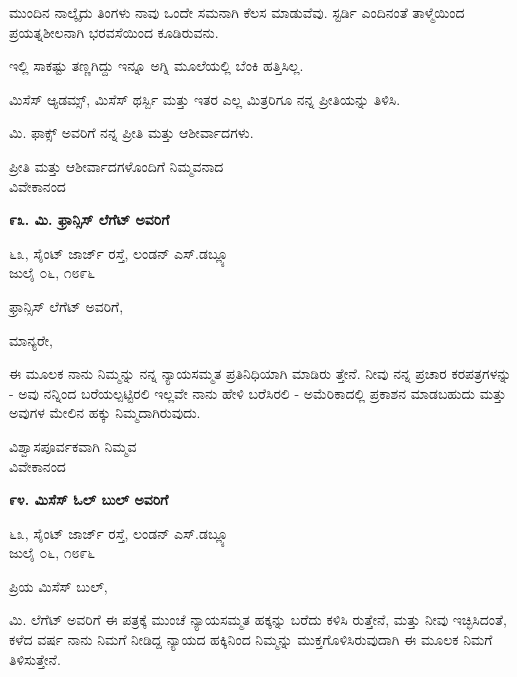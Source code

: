 ಮುಂದಿನ ನಾಲ್ಕೈದು ತಿಂಗಳು ನಾವು ಒಂದೇ ಸಮನಾಗಿ ಕೆಲಸ ಮಾಡುವೆವು. ಸ್ಟರ್ಡಿ ಎಂದಿನಂತೆ ತಾಳ್ಮೆಯಿಂದ ಪ್ರಯತ್ನಶೀಲನಾಗಿ ಭರವಸೆಯಿಂದ ಕೂಡಿರುವನು.

ಇಲ್ಲಿ ಸಾಕಷ್ಟು ತಣ್ಣಗಿದ್ದು ಇನ್ನೂ ಅಗ್ನಿ ಮೂಲೆಯಲ್ಲಿ ಬೆಂಕಿ ಹತ್ತಿಸಿಲ್ಲ.

ಮಿಸೆಸ್ ಆ್ಯಡಮ್ಸ್, ಮಿಸೆಸ್ ಥರ್ಸ್ಬಿ ಮತ್ತು ಇತರ ಎಲ್ಲ ಮಿತ್ರರಿಗೂ ನನ್ನ ಪ್ರೀತಿಯನ್ನು ತಿಳಿಸಿ.

ಮಿ. ಫಾಕ್ಸ್ ಅವರಿಗೆ ನನ್ನ ಪ್ರೀತಿ ಮತ್ತು ಆಶೀರ್ವಾದಗಳು.

\begin{flushright}
ಪ್ರೀತಿ ಮತ್ತು ಆಶೀರ್ವಾದಗಳೊಂದಿಗೆ ನಿಮ್ಮವನಾದ\\ವಿವೇಕಾನಂದ
\end{flushright}

\begin{center}
\textbf{೯೩. ಮಿ. ಫ್ರಾನ್ಸಿಸ್ ಲೆಗೆಟ್ ಅವರಿಗೆ}
\end{center}

\begin{flushright}
೬೩, ಸೈಂಟ್ ಜಾರ್ಜ್ ರಸ್ತೆ, ಲಂಡನ್ ಎಸ್.ಡಬ್ಲ್ಯೂ\\ಜುಲೈ ೦೬, ೧೮೯೬
\end{flushright}

ಫ್ರಾನ್ಸಿಸ್ ಲೆಗೆಟ್ ಅವರಿಗೆ,

ಮಾನ್ಯರೇ,

ಈ ಮೂಲಕ ನಾನು ನಿಮ್ಮನ್ನು ನನ್ನ ನ್ಯಾಯಸಮ್ಮತ ಪ್ರತಿನಿಧಿಯಾಗಿ ಮಾಡಿರು ತ್ತೇನೆ. ನೀವು ನನ್ನ ಪ್ರಚಾರ ಕರಪತ್ರಗಳನ್ನು - ಅವು ನನ್ನಿಂದ ಬರೆಯಲ್ಪಟ್ಟಿರಲಿ ಇಲ್ಲವೇ ನಾನು ಹೇಳಿ ಬರೆಸಿರಲಿ - ಅಮೆರಿಕಾದಲ್ಲಿ ಪ್ರಕಾಶನ ಮಾಡಬಹುದು ಮತ್ತು ಅವುಗಳ ಮೇಲಿನ ಹಕ್ಕು ನಿಮ್ಮದಾಗಿರುವುದು.

\begin{flushright}
ವಿಶ್ವಾಸಪೂರ್ವಕವಾಗಿ ನಿಮ್ಮವ\\ವಿವೇಕಾನಂದ
\end{flushright}

\begin{center}
\textbf{೯೪. ಮಿಸೆಸ್ ಓಲ್ ಬುಲ್ ಅವರಿಗೆ}
\end{center}

\begin{flushright}
೬೩, ಸೈಂಟ್ ಜಾರ್ಜ್ ರಸ್ತೆ, ಲಂಡನ್ ಎಸ್.ಡಬ್ಲ್ಯೂ\\ಜುಲೈ ೦೬, ೧೮೯೬
\end{flushright}

ಪ್ರಿಯ ಮಿಸೆಸ್ ಬುಲ್,

ಮಿ. ಲೆಗೆಟ್ ಅವರಿಗೆ ಈ ಪತ್ರಕ್ಕೆ ಮುಂಚೆ ನ್ಯಾಯಸಮ್ಮತ ಹಕ್ಕನ್ನು ಬರೆದು ಕಳಿಸಿ ರುತ್ತೇನೆ, ಮತ್ತು ನೀವು ಇಚ್ಛಿಸಿದಂತೆ, ಕಳೆದ ವರ್ಷ ನಾನು ನಿಮಗೆ ನೀಡಿದ್ದ ನ್ಯಾಯದ ಹಕ್ಕಿನಿಂದ ನಿಮ್ಮನ್ನು ಮುಕ್ತಗೊಳಿಸಿರುವುದಾಗಿ ಈ ಮೂಲಕ ನಿಮಗೆ ತಿಳಿಸುತ್ತೇನೆ.

